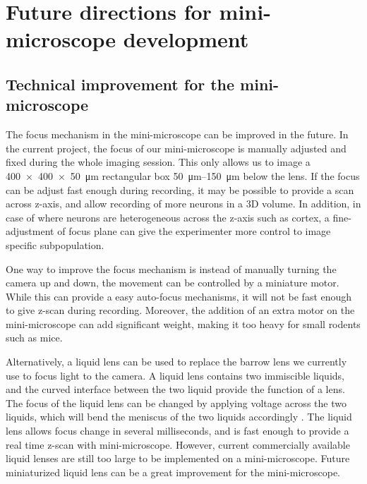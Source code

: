 \section{Future directions for mini-microscope development}
\subsection{Technical improvement for the mini-microscope}

The focus mechanism in the mini-microscope can be improved in the future. In the current project, the focus of our mini-microscope is manually adjusted and fixed during the whole imaging session. This only allows us to image a \SI{400x400x50}{\um} rectangular box \SIrange{50}{150}{\um} below the lens. If the focus can be adjust fast enough during recording, it may be possible to provide a scan across z-axis, and allow recording of more neurons in a 3D volume. In addition, in case of where neurons are heterogeneous across the z-axis such as cortex, a fine-adjustment of focus plane can give the experimenter more control to image specific subpopulation.

One way to improve the focus mechanism is instead of manually turning the camera up and down, the movement can be controlled by a miniature motor. While this can provide a easy auto-focus mechanisms, it will not be fast enough to give z-scan during recording. Moreover, the addition of an extra motor on the mini-microscope can add significant weight, making it too heavy for small rodents such as mice. 

Alternatively, a liquid lens can be used to replace the barrow lens we currently use to focus light to the camera. A liquid lens contains two immiscible liquids, and the curved interface between the two liquid provide the function of a lens. The focus of the liquid lens can be changed by applying voltage across the two liquids, which will bend the meniscus of the two liquids accordingly \citep{kuiper04}. The liquid lens allows focus change in several milliseconds, and is fast enough to provide a real time z-scan with mini-microscope. However, current commercially available liquid lenses are still too large to be implemented on a mini-microscope. Future miniaturized liquid lens can be a great improvement for the mini-microscope.

